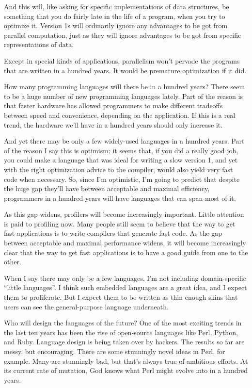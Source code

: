\documentclass[12pt]{book}
\begin{document}
And this will, like asking for specific implementations of data
structures, be something that you do fairly late in the life of a
program, when you try to optimize it. Version 1s will ordinarily ignore
any advantages to be got from parallel computation, just as they will
ignore advantages to be got from specific representations of data.

Except in special kinds of applications, parallelism won't pervade the
programs that are written in a hundred years. It would be premature
optimization if it did.

How many programming languages will there be in a hundred years? There
seem to be a huge number of new programming languages lately. Part of
the reason is that faster hardware has allowed programmers to make
different tradeoffs between speed and convenience, depending on the
application. If this is a real trend, the hardware we'll have in a
hundred years should only increase it.

And yet there may be only a few widely-used languages in a hundred
years. Part of the reason I say this is optimism: it seems that, if you
did a really good job, you could make a language that was ideal for
writing a slow version 1, and yet with the right optimization advice to
the compiler, would also yield very fast code when necessary. So, since
I'm optimistic, I'm going to predict that despite the huge gap they'll
have between acceptable and maximal efficiency, programmers in a hundred
years will have languages that can span most of it.

As this gap widens, profilers will become increasingly important. Little
attention is paid to profiling now. Many people still seem to believe
that the way to get fast applications is to write compilers that
generate fast code. As the gap between acceptable and maximal
performance widens, it will become increasingly clear that the way to
get fast applications is to have a good guide from one to the other.

When I say there may only be a few languages, I'm not including
domain-specific ``little languages''. I think such embedded languages
are a great idea, and I expect them to proliferate. But I expect them to
be written as thin enough skins that users can see the general-purpose
language underneath.

Who will design the languages of the future? One of the most exciting
trends in the last ten years has been the rise of open-source languages
like Perl, Python, and Ruby. Language design is being taken over by
hackers. The results so far are messy, but encouraging. There are some
stunningly novel ideas in Perl, for example. Many are stunningly bad,
but that's always true of ambitious efforts. At its current rate of
mutation, God knows what Perl might evolve into in a hundred years.
\end{document}
